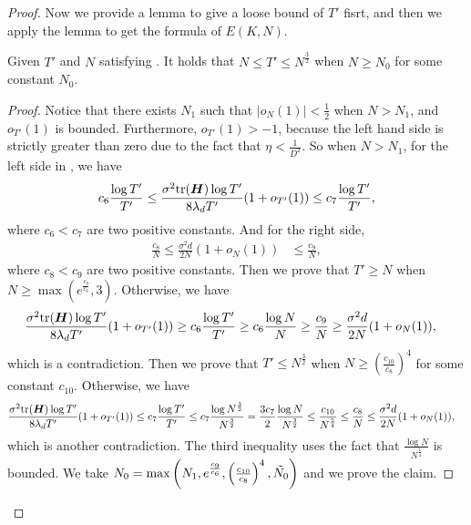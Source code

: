 \begin{proof}
Now we provide a lemma to give a loose bound of $T'$ fisrt, and then we apply the lemma to get the formula of $E(K,N)$.
\begin{lemma}\label{lem:k-large-loss-bound-T'}
    Given $T'$ and $N$ satisfying . It holds that $N\leq T'\leq N^{\frac{3}{2}}$ when $N\geq N_0$ for some constant $N_0$.
\end{lemma}
\begin{proof}
Notice that there exists $N_1$ such that $|o_N(1)|<\frac{1}{2}$ when $N>N_1$, and $o_{T'}(1)$ is bounded. Furthermore, $o_{T'}(1)>-1$, because the left hand side is strictly greater than zero due to the fact that $\eta < \frac{1}{D^2}$. So when $N>N_1$, for the left side in , we have
\begin{align*}
     c_{6}\frac{\log T'}{T'}&\leq \frac{\sigma^2\mathrm{tr}({\bm{H}})\log T'}{8\lambda_dT'}(1+o_{T'}(1))\leq c_{7}\frac{\log T'}{T'}, \\
\end{align*}
where $c_{6} < c_{7}$ are two positive constants. And for the right side,  
\begin{align*}
     \frac{c_{8}}{N}\leq\frac{\sigma^2d}{2N}(1+o_N(1))&\leq \frac{c_{9}}{N},
\end{align*}
where $c_{8} < c_{9}$ are two positive constants. Then we prove that $T'\geq N$ when $N \geq \max\left(e^{\frac{c_{9}}{c_{6}}}, 3\right)$. Otherwise, we have 
\begin{align*}
    \frac{\sigma^2\mathrm{tr}({\bm{H}})\log T'}{8\lambda_dT'}(1+o_{T'}(1))&\geq c_{6}\frac{\log T'}{T'} \geq c_{6}\frac{\log N}{N}\geq\frac{c_{9}}{N}\geq \frac{\sigma^2d}{2N}(1+o_N(1)),
\end{align*}
which is a contradiction.
Then we prove that $T'\leq N^{\frac{3}{2}}$ when $N\geq\left(\frac{c_{10}}{c_{8}}\right)^4$ for some constant $c_{10}$. Otherwise, we have 
\begin{align*}
    \frac{\sigma^2\mathrm{tr}({\bm{H}})\log T'}{8\lambda_dT'}(1+o_{T'}(1))&\leq c_{7}\frac{\log T'}{T'} \leq c_{7}\frac{\log N^{\frac{3}{2}}}{N^{\frac{3}{2}}}=\frac{3c_{7}}{2}\frac{\log N}{N^{\frac{3}{2}}} \leq \frac{c_{10}}{N^{\frac{5}{4}}}\leq \frac{c_{8}}{N}\leq
    \frac{\sigma^2d}{2N}(1+o_N(1)),
\end{align*}
which is another contradiction. The third inequality uses the fact that $\frac{\log N}{N^{\frac{1}{4}}}$ is bounded. We take $N_0 = \max\left(N_1,e^{\frac{c_{9}}{c_{6}}},\left(\frac{c_{10}}{c_{8}}\right)^4, \Tilde{N_0}\right)$ and we prove the claim.
\end{proof}

\end{proof}

